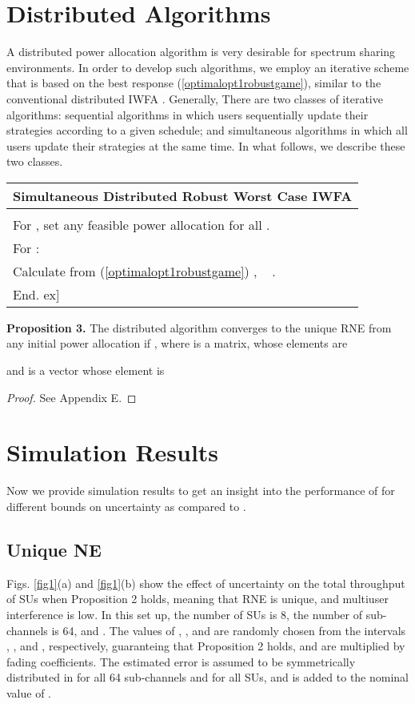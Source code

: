 \documentclass[peerreview,onecolumn,11pt,draftclsnofoot]{IEEEtran}\usepackage{amsmath}\usepackage{amsfonts}\usepackage{epsfig}\usepackage{amssymb}\usepackage{graphicx}\usepackage{amssymb,amsmath}\usepackage{cite}\usepackage{color,soul}\newcommand\T{\rule{0pt}{3.1ex}}
\begin{document}
\section{Distributed Algorithms}
A distributed power allocation algorithm is very desirable for
spectrum sharing environments. In order to develop such algorithms, we employ an iterative scheme that is based on the best response (\ref{optimalopt1robustgame}), similar to  the conventional distributed IWFA \cite{Nash2}. Generally, There are two classes of iterative algorithms: sequential algorithms in which users sequentially update their strategies according to a given schedule; and simultaneous algorithms in which all users update their strategies at the same time. In what follows, we describe these two classes.

\begin{table}[h]
\begin{tabular}{l}
\textbf{\quad\quad\quad Simultaneous Distributed Robust Worst Case IWFA}\\
\hline
\\\quad\quad For , set any feasible power allocation  for all .
\\ \quad \quad\quad  For :   \\ \quad\quad\quad\quad\quad
Calculate  from (\ref{optimalopt1robustgame}) ,
\,\,\, .
\\\quad  \quad\quad End. \1ex] \hline
\end{tabular}
\end{table}

\textbf{Proposition 3.} The distributed algorithm converges to the unique RNE from any initial power allocation  if
,
where  is a  matrix, whose elements are

 and  is a  vector whose  element is 
\begin{proof}
See Appendix E.
\end{proof}

\section{Simulation Results}
Now we provide simulation results to get an insight into the
performance of  for different bounds on uncertainty as compared to .

\subsection{Unique NE}
Figs. \ref{fig1}(a) and \ref{fig1}(b) show the effect of
uncertainty on the total throughput of SUs when Proposition 2  holds, meaning that RNE is unique, and multiuser interference is low. In this set up, the number of SUs is 8, the number of sub-channels is 64, and
.
The values of , , and  are randomly chosen from the intervals , , and
, respectively, guaranteing that Proposition 2 holds,
and are multiplied by fading coefficients. The estimated error is assumed to be symmetrically distributed in  for all 64 sub-channels and for all SUs, and is added to the nominal value of .
\end{document}
